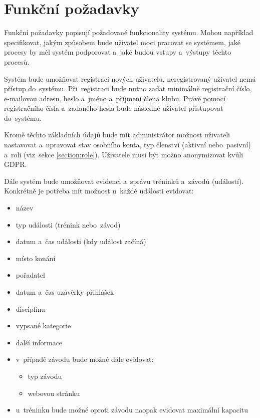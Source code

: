 \section{Funkční požadavky}
Funkční požadavky popisují požadované funkcionality systému. Mohou například specifikovat, jakým způsobem bude uživatel moci pracovat se systémem, jaké procesy by měl systém podporovat a~jaké budou vstupy a~výstupy těchto procesů. \cite{requirements}

\begin{enumerate}[label=\textcolor{decoration}{\textbf{F\arabic*}}, leftmargin=6mm]
	Systém bude umožňovat registraci nových uživatelů, neregistrovaný uživatel nemá přístup do~systému. Při~registraci bude nutno zadat minimálně registrační číslo, e-mailovou adresu, heslo a~jméno a~příjmení člena klubu. Právě pomocí registračního čísla a~zadaného hesla bude následně uživatel přistupovat do~systému.

	Kromě těchto základních údajů bude mít administrátor možnost uživateli nastavovat a~upravovat stav osobního konta, typ členství (aktivní nebo~pasivní) a~roli (viz~sekce \ref{section:role}). Uživatele musí být možno anonymizovat kvůli GDPR.

	Dále systém bude umožňovat evidenci a~správu tréninků a~závodů (událostí). Konkrétně je potřeba mít možnost u~každé události evidovat:
	\begin{itemize}
		\item název
		\item typ události (trénink nebo~závod)
		\item datum a~čas události (kdy událost začíná)
		\item místo konání
		\item pořadatel
		\item datum a~čas uzávěrky přihlášek
		\item disciplínu
		\item vypsané kategorie
		\item další informace
		\item v~případě závodu bude možné dále evidovat:
		\begin{itemize}
			\item typ závodu
			\item webovou stránku
		\end{itemize}
		\item u~tréninku bude možné oproti závodu naopak evidovat maximální kapacitu
	\end{itemize}


\end{enumerate}

